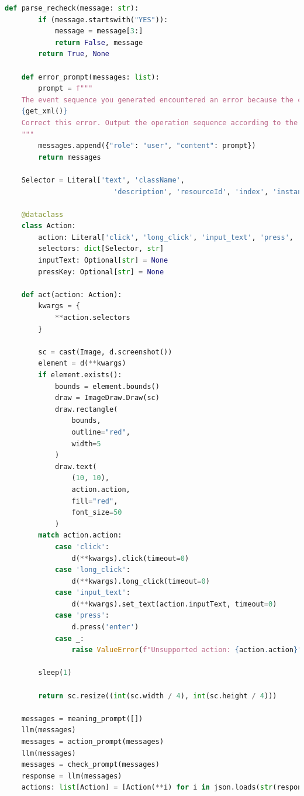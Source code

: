 \documentclass[UTF8, fontset=windows]{article}
\begin{document}
\begin{lstlisting}[language=Python]
    def parse_recheck(message: str):
        if (message.startswith("YES")):
            message = message[3:]
            return False, message
        return True, None
    
    def error_prompt(messages: list):
        prompt = f"""
    The event sequence you generated encountered an error because the corresponding element could not be found. This is the current XML representation of the application. 
    {get_xml()}
    Correct this error. Output the operation sequence according to the previous rules.
    """
        messages.append({"role": "user", "content": prompt})
        return messages
    
    Selector = Literal['text', 'className',
                          'description', 'resourceId', 'index', 'instance']
    
    @dataclass
    class Action:
        action: Literal['click', 'long_click', 'input_text', 'press', 'swipe', 'scroll']
        selectors: dict[Selector, str]
        inputText: Optional[str] = None
        pressKey: Optional[str] = None
    
    def act(action: Action):
        kwargs = {
            **action.selectors
        }
        
        sc = cast(Image, d.screenshot())
        element = d(**kwargs)
        if element.exists():
            bounds = element.bounds()
            draw = ImageDraw.Draw(sc)
            draw.rectangle(
                bounds,
                outline="red",
                width=5
            )
            draw.text(
                (10, 10),
                action.action,
                fill="red",
                font_size=50
            )
        match action.action:
            case 'click':
                d(**kwargs).click(timeout=0)
            case 'long_click':
                d(**kwargs).long_click(timeout=0)
            case 'input_text':
                d(**kwargs).set_text(action.inputText, timeout=0)
            case 'press':
                d.press('enter')
            case _:
                raise ValueError(f"Unsupported action: {action.action}")
            
        sleep(1)
            
        return sc.resize((int(sc.width / 4), int(sc.height / 4)))
    
    messages = meaning_prompt([])
    llm(messages)
    messages = action_prompt(messages)
    llm(messages)
    messages = check_prompt(messages)
    response = llm(messages)
    actions: list[Action] = [Action(**i) for i in json.loads(str(response.content))]
    

\end{lstlisting}
\end{document}
